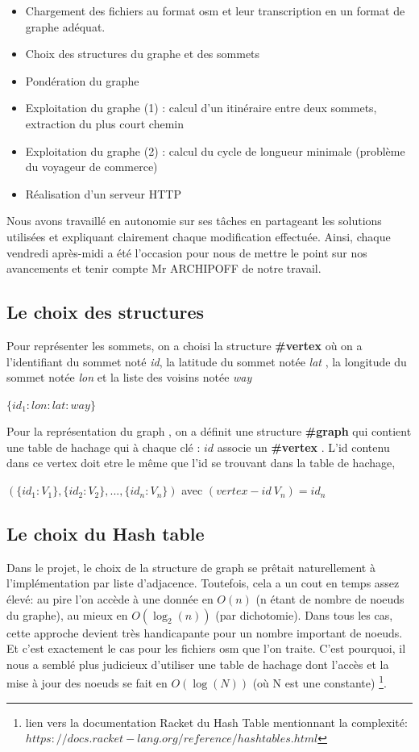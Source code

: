 \documentclass[french]{article}
\begin{document}
\begin{itemize}
\item Chargement des fichiers au format osm et leur transcription en un format de graphe adéquat.
\item Choix des structures du graphe et des sommets
\item Pondération du graphe
\item Exploitation du graphe (1) : calcul d’un itinéraire entre deux sommets, extraction du plus court chemin 
\item Exploitation du graphe (2) : calcul du cycle de longueur minimale (problème du voyageur de commerce) 
\item Réalisation d’un serveur HTTP 
\end{itemize}


Nous avons travaillé en autonomie sur ses tâches en partageant les solutions utilisées et expliquant clairement chaque modification effectuée. Ainsi, chaque vendredi après-midi a été l’occasion pour nous de mettre le point sur nos avancements et tenir compte Mr ARCHIPOFF de notre travail.  

\subsection{Le choix des structures} 

Pour représenter les sommets, on a choisi la structure \textbf{\#vertex} où on a l'identifiant du sommet noté  \textit{id}, la latitude du sommet notée \textit{lat} , la longitude du sommet notée \textit{lon} et la liste des voisins notée \textit{way}
\begin{center}
                               $\{id_1:lon:lat:way\}$
\end{center}
Pour la représentation du graph , on a définit une structure \textbf{\#graph} qui contient une table de hachage qui à chaque clé : $id$ associe un \textbf{\#vertex} . L'id contenu dans ce vertex doit etre le même que l'id se trouvant dans la table de hachage, 
\begin{center} 
                   $(\{id_1:V_1\},\{id_2:V_2\},..., \{id_n:V_n\})$ avec $(vertex-id~V_n)=id_n$
\end{center}

\subsection{Le choix du Hash table}%
Dans le projet, le choix de la structure de graph se prêtait naturellement à l'implémentation par liste d'adjacence. Toutefois, cela a un cout en temps assez élevé: au pire l'on accède à une donnée en $O(n)$ (n étant de nombre de noeuds du graphe), au mieux en $O(\log_2(n))$ (par dichotomie). Dans tous les cas, cette approche devient très handicapante pour un nombre important de noeuds. Et c'est exactement le cas pour les fichiers osm que l'on traite. C'est pourquoi, il nous a semblé plus judicieux d'utiliser une table de hachage dont l'accès et la mise à jour des noeuds se fait en $O(\log(N))$ (où N est une constante)
\footnote{lien vers la documentation Racket du Hash Table mentionnant la complexité: $https://docs.racket-lang.org/reference/hashtables.html$}.
\end{document}
